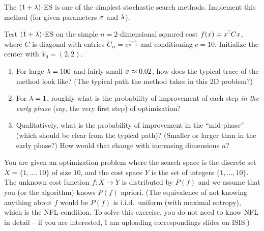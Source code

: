 

\renewcommand{\course}{Optimization Algorithms}
\renewcommand{\coursepicture}{optim}
\renewcommand{\coursedate}{Winter 2024/25}
\renewcommand{\exnum}{Weekly Exercises 9}

\exercises


\exercisestitle



The $(1+\lambda)$-ES is one of the simplest stochastic search methods. Implement this method (for given parameters $\sigma$ and $\lambda$).

Test $(1+\lambda)$-ES on the simple $n=2$-dimensional squared cost $f(x) = x^{\!\top\!} C x$, where $C$ is diagonal with entries $C_{ii} = c^{\frac{i-1}{n-1}}$ and conditioning $c=10$. Initialize the center with $\hat x_0 = (2,2)$.

\begin{enumerate}
\item For large $\lambda=100$ and fairly small $\sigma \approx 0.02$, how does the typical trace of the method look like? (The typical path the method takes in this 2D problem?)
\item For $\lambda=1$, roughly what is the probability of improvement of each step \emph{in the early phase} (say, the very first step) of optimization?
\item Qualitatively, what is the probability of improvement in the ``mid-phase'' (which should be clear from the typical path)? (Smaller or larger than in the early phase?) How would that change with increasing dimensions $n$?
\end{enumerate}




You are given an optimization problem where the search space is the discrete
set $X= \{1, \ldots, 10\}$ of size $10$, and the cost space $Y$ is the set of integers $\{1, \ldots, 10\}$. The unknown cost function $f:X \to Y$ is distributed by $P(f)$ and we assume that you (or the algorithm) knows $P(f)$ apriori. (The equivalence of not knowing anything about $f$ would be $P(f)$ is i.i.d.\ uniform (with maximal entropy), which is the NFL condition. To solve this exercise, you do not need to know NFL in detail -- if you are interested, I am uploading correspondings slides on ISIS.)

